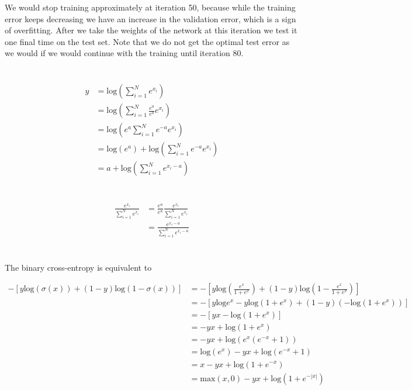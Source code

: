 \documentclass[11pt]{article}
\newcommand{\exercise}{\section{}}
\newcommand{\sumf}[3]{\sum_{#1}^{#2} #3}
\begin{document}
\noindent We would stop training approximately at iteration 50, because while the training error keeps decreasing we have an increase in the validation error, which is a sign of overfitting. After we take the weights of the network at this iteration we test it one final time on the test set. Note that we do not get the optimal test error as we would if we would continue with the training until iteration 80.

\exercise

\begin{align*}
y &= \text{log}(\sumf{i=1}{N}{ e^{x_i} }) \\
&= \text{log}(\sumf{i=1}{N}{ \frac{e^a}{e^a} e^{x_i} }) \\
&= \text{log}(e^a \sumf{i=1}{N}{e^{-a} e^{x_i} }) \\
&= \text{log}(e^a) + \text{log}(\sumf{i=1}{N}{e^{-a} e^{x_i} }) \\
&= a + \text{log}(\sumf{i=1}{N}{e^{x_i - a} })
\end{align*}

\exercise

\begin{align*}
\frac{e^{x_i}}{\sumf{i=1}{N}{e^{x_i}}} &= \frac{e^{a}}{e^{a}} \frac{e^{x_i}}{\sumf{i=1}{N}{e^{x_i}}} \\
&= \frac{e^{x_i - a}}{\sumf{i=1}{N}{e^{x_i - a}}}
\end{align*}

\exercise

\noindent The binary cross-entropy is equivalent to

\begin{align*}
-[y \text{log}(\sigma(x)) + (1 - y) \text{log}(1 - \sigma(x)) ] &= -[y \text{log}(\frac{e^x}{1 + e^x}) + (1 - y) \text{log}(1 - \frac{e^x}{1 + e^x}) ] \\
&= -[ y \text{log}e^x -y \text{log}(1 + e^x) + (1 - y)( -\text{log}(1 + e^x ))] \\
&= -[yx - \text{log}(1 + e^x )] \\
&= -yx + \text{log}(1 + e^x ) \\
&= -yx + \text{log}(e^x(e^{-x} + 1 )) \\
&= \text{log}(e^x) -yx +  \text{log}(e^{-x} + 1 ) \\
&= x -yx + \text{log}( 1 + e^{-x} ) \\
&= \text{max}(x,0) -yx + \text{log}( 1 + e^{-|x|} ) \tag{see below}
\end{align*}
\end{document}
